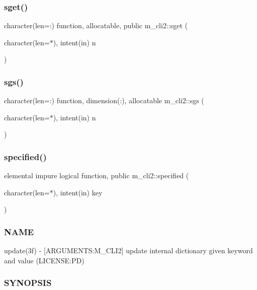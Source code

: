 \subsubsection{\texorpdfstring{sget()}{sget()}}
{\footnotesize\ttfamily character(len=\+:) function, allocatable, public m\+\_\+cli2\+::sget (\begin{DoxyParamCaption}\item[{character(len=$\ast$), intent(in)}]{n }\end{DoxyParamCaption})}

\mbox{\label{namespacem__cli2_aa4eb8a68238351ba1893f9ce555f5c49}} 
\subsubsection{\texorpdfstring{sgs()}{sgs()}}
{\footnotesize\ttfamily character(len=\+:) function, dimension(\+:), allocatable m\+\_\+cli2\+::sgs (\begin{DoxyParamCaption}\item[{character(len=$\ast$), intent(in)}]{n }\end{DoxyParamCaption})\hspace{0.3cm}{\ttfamily [private]}}

\mbox{\label{namespacem__cli2_a90118f308a5120041a5862fca4740367}} 
\subsubsection{\texorpdfstring{specified()}{specified()}}
{\footnotesize\ttfamily elemental impure logical function, public m\+\_\+cli2\+::specified (\begin{DoxyParamCaption}\item[{character(len=$\ast$), intent(in)}]{key }\end{DoxyParamCaption})}



\subsubsection*{N\+A\+ME}

update(3f) -\/ \mbox{[}A\+R\+G\+U\+M\+E\+N\+TS\+:M\+\_\+\+C\+L\+I2\mbox{]} update internal dictionary given keyword and value (L\+I\+C\+E\+N\+SE\+:PD) \subsubsection*{S\+Y\+N\+O\+P\+S\+IS}

